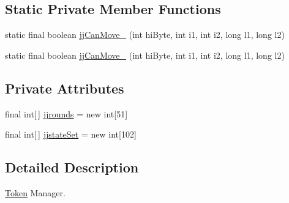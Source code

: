 \subsection*{Static Private Member Functions}
\begin{DoxyCompactItemize}
\item 
static final boolean \hyperlink{classde_1_1uulm_1_1ecs_1_1ai_1_1owlapi_1_1krssparser_1_1_k_r_s_s2_parser_token_manager_a38e566fe016f2cafbe9ebf117dd479cf}{jj\-Can\-Move\-\_} (int hi\-Byte, int i1, int i2, long l1, long l2)
\item 
static final boolean \hyperlink{classde_1_1uulm_1_1ecs_1_1ai_1_1owlapi_1_1krssparser_1_1_k_r_s_s2_parser_token_manager_af6223ae175db238cab7e72da8d062b5e}{jj\-Can\-Move\-\_} (int hi\-Byte, int i1, int i2, long l1, long l2)
\end{DoxyCompactItemize}
\subsection*{Private Attributes}
\begin{DoxyCompactItemize}
\item 
final int\mbox{[}$\,$\mbox{]} \hyperlink{classde_1_1uulm_1_1ecs_1_1ai_1_1owlapi_1_1krssparser_1_1_k_r_s_s2_parser_token_manager_a11f7c9f93df5198c0961169c151da821}{jjrounds} = new int\mbox{[}51\mbox{]}
\item 
final int\mbox{[}$\,$\mbox{]} \hyperlink{classde_1_1uulm_1_1ecs_1_1ai_1_1owlapi_1_1krssparser_1_1_k_r_s_s2_parser_token_manager_a28c39d1d3c71e05c1099c7a1ae584464}{jjstate\-Set} = new int\mbox{[}102\mbox{]}
\end{DoxyCompactItemize}


\subsection{Detailed Description}
\hyperlink{classde_1_1uulm_1_1ecs_1_1ai_1_1owlapi_1_1krssparser_1_1_token}{Token} Manager. 

